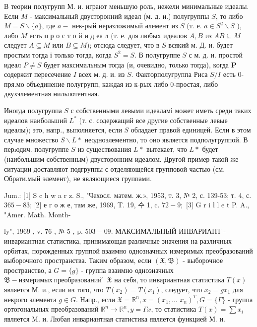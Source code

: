 \documentclass[10pt]{article}
\begin{document}
В теории полугрупп М. и. играют меньшую роль, нежели минимальные идеалы. Если $M$ - максимальный двусторонний идеал (м. д. и.) полугруппы $S$, то либо $M=S \backslash\{a\}$, где $a-$ нек-рый неразложимый әлемент из $S$ (т. е. $a \in S^{2} \backslash S$ ), либо $M$ есть п р о с т о й и д еа л (т. е. для любых идеалов $A, B$ из $A B \subseteq M$ следует $A \subseteq M$ или $B \subseteq M)$; отсюда следует, что в $S$ всякий м. Д. и. будет простым тогда і только тогда, когда $S^{2}=S$. В полугруппе $S$ с м. д. и. простой идеал $P \neq S$ будет максимальным тогда (и, очевидно, только тогда), когда $\boldsymbol{P}$ содержит пересечение $I$ всех м. д. и. из $S$. Факторполугруппа Риса $S / I$ есть 0-пря.мо объединение полугрупп, каждая из к-рых либо 0-простая, либо двухэлементная нильпотентная.



Иногда полугруппа $S$ с собственными левыми идеаламі может иметь среди таких идеалов наибольший $L^{*}$ (т. с. содержащий все другие собственные левые идеалы); это, напр., выполняется, если $S$ обладает правой единицей. Если в этом случае множество $S \backslash L *$ неодноэлементно, то оно является подполугруппой. В перıодич. полугруппе $S$ из существования $L *$ вытекает, что $L *$ будет (наибольшим собственным) двусторонним идеалом. Другой пример такой же ситуации доставляют подгруппы с отделяющейся групповой частью (см. Обрати.мый элемент), не являющиеся группами.



Jum.: [1] S c h w a r z. S., "Чехосл. матем. ж.», 1953, т. 3, № 2, с. 139-53; т. 4, с. $365-83$; [2] е г о ж е, там же, 1969, T. 19, 수 1, c. $72-9 ;$ [3] G r i l l e t P. A., "Amer. Math. Month-

ly", 1969 , v. 76 , № 5 , p. $503-09$. МАКСИМАЛЬНЫЙ ИНВАРИАНТ - инвариантная статистика, принимающая различные значения на различных орбитах, порожденных группой взаимно однозначных измеримых преобразований выборочного пространства. Таким образом, если $(\mathfrak{X}, \mathfrak{B})$ - выборочное пространство, а $G=\{g\}$ - группа взаимно однозначных $\mathfrak{B}-и з м е р и м ы х ~ п р е о б р а з о в а н и и ̆ ~ \mathfrak{X}$ на себя, то инвариантная статистика $T(x)$ является М. и., если из того, что $T\left(x_{2}\right)=T\left(x_{1}\right)$, следует, что $x_{2}=g x_{1}$ для некрого элемента $g \in G$. Напр., если $\mathfrak{X}=\mathbb{R}^{n}, x=\left(x_{1}, \ldots\right.$ $\left.x_{n}\right)^{T}, G=\{\Gamma\}$ - группа ортогональных преобразований $\mathbb{R}^{n} \rightarrow \mathbb{R}^{n}, y=\Gamma x$, то статистика $T(x)=\sum x_{i}$ является M. и. Любая инвариантная статистика является функцией М. и.
\end{document}
